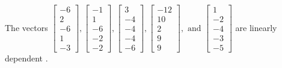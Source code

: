 \begin{exercise}
\begin{exerciseStatement}
  \end{exerciseStatement}
  \begin{exerciseAnswer}
   The vectors \(\left[\begin{array}{r}
-6 \\
2 \\
-6 \\
1 \\
-3
\end{array}\right] , \left[\begin{array}{r}
-1 \\
1 \\
-6 \\
-2 \\
-2
\end{array}\right] , \left[\begin{array}{r}
3 \\
-4 \\
-4 \\
-4 \\
-6
\end{array}\right] , \left[\begin{array}{r}
-12 \\
10 \\
2 \\
9 \\
9
\end{array}\right] , \text{ and } \left[\begin{array}{r}
1 \\
-2 \\
-4 \\
-3 \\
-5
\end{array}\right]\) are 
  	 linearly dependent  .
  


  \end{exerciseAnswer}
\end{exercise}
